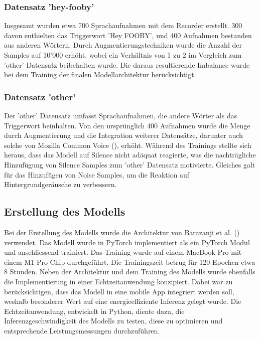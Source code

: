 \documentclass[11pt,a4paper]{article}
\begin{document}
\subsubsection{Datensatz 'hey-fooby'}
Insgesamt wurden etwa 700 Sprachaufnahmen mit dem Recorder erstellt. 300 davon enthielten das 
Triggerwort 'Hey FOOBY', und 400 Aufnahmen bestanden aus anderen Wörtern. Durch 
Augmentierungstechniken wurde die Anzahl der Samples auf 10'000 erhöht, wobei ein Verhältnis von 
1 zu 2 im Vergleich zum 'other' Datensatz beibehalten wurde. Die daraus resultierende 
Imbalance wurde bei dem Training der finalen Modellarchitektur berücksichtigt.

\subsubsection{Datensatz 'other'}
Der 'other' Datensatz umfasst Sprachaufnahmen, die andere Wörter als das Triggerwort beinhalten. 
Von den ursprünglich 400 Aufnahmen wurde die Menge durch Augmentierung und die Integration 
weiterer Datensätze, darunter auch solche von Mozilla Common Voice (\cite{ardila2020common}), 
erhöht. Während des Trainings stellte sich heraus, dass das Modell auf Silence nicht adäquat 
reagierte, was die nachträgliche Hinzufügung von Silence Samples zum 'other' Datensatz motivierte. 
Gleiches galt für das Hinzufügen von Noise Samples, um die Reaktion auf Hintergrundgeräusche zu 
verbessern.


\newpage

\subsection{Erstellung des Modells}
Bei der Erstellung des Modells wurde die Architektur von Barazanji et al. 
(\cite{barazanji2023heyditto}) verwendet. Das Modell wurde in PyTorch implementiert als ein PyTorch 
Modul und anschliessend trainiert. Das Training wurde auf einem MacBook Pro mit einem M1 Pro Chip 
durchgeführt. Die Trainingszeit betrug für 120 Epochen etwa 8 Stunden. Neben der Architektur und 
dem Training des Modells wurde ebenfalls die Implementierung in einer Echtzeitanwendung konzipiert. 
Dabei war zu berücksichtigen, dass das Modell in eine mobile App integriert werden soll, weshalb 
besonderer Wert auf eine energieeffiziente Inferenz gelegt wurde. Die Echtzeitanwendung, entwickelt 
in Python, diente dazu, die Inferenzgeschwindigkeit des Modells zu testen, diese zu optimieren und 
entsprechende Leistungsmessungen durchzuführen.
\end{document}
